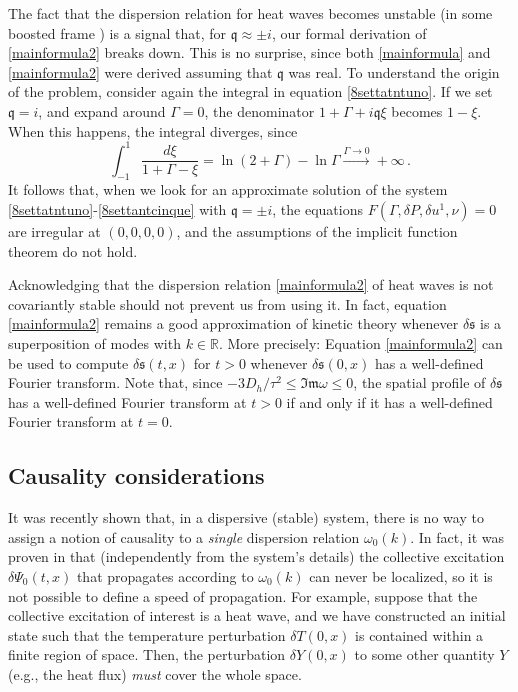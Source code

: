 \documentclass[a4paper, amsfonts, amssymb, amsmath, reprint, showkeys, nofootinbib, twoside,notitlepage,onecolumn]{revtex4-2}
\newcommand{\q}{{\mathfrak{q}}}
\theoremstyle{definition}
\theoremstyle{theorem}
\theoremstyle{corollary}
\begin{document}
The fact that the dispersion relation for heat waves becomes unstable (in some boosted frame \cite{GavassinoBounds2023}) is a signal that, for $\q \approx \pm i$, our formal derivation of \eqref{mainformula2} breaks down. This is no surprise, since both \eqref{mainformula} and \eqref{mainformula2} were derived assuming that $\q$ was real. To understand the origin of the problem, consider again the integral in equation \eqref{8settatntuno}. If we set $\q= i$, and expand around $\Gamma=0$, the denominator $1{+}\Gamma {+} i \q \xi$ becomes $1- \xi$. When this happens, the integral diverges, since
\begin{equation}
\int_{-1}^1 \dfrac{d\xi}{1+\Gamma - \xi} = \ln(2{+}\Gamma)-\ln \Gamma  \xrightarrow[]{\Gamma \longrightarrow 0} +\infty \, .
\end{equation}
It follows that, when we look for an approximate solution of the system \eqref{8settatntuno}-\eqref{8settantcinque} with $\q=\pm i$, the equations $F(\Gamma,\delta P,\delta u^1,\nu){=}0$ are irregular at $(0,0,0,0)$, and the assumptions of the implicit function theorem do not hold. 

Acknowledging that the dispersion relation \eqref{mainformula2} of heat waves is not covariantly stable should not prevent us from using it. In fact, equation \eqref{mainformula2} remains a good approximation of kinetic theory whenever $\delta \mathfrak{s}$ is a superposition of modes with $k \in \mathbb{R}$. More precisely: Equation \eqref{mainformula2} can be used to compute $\delta \mathfrak{s}(t,x)$ for $t>0$ whenever $\delta \mathfrak{s}(0,x)$ has a well-defined Fourier transform. Note that, since $-3D_h/\tau^2 \leq \mathfrak{Im} \omega \leq 0$, the spatial profile of $\delta \mathfrak{s}$ has a well-defined Fourier transform at $t>0$ if and only if it has a well-defined Fourier transform at $t=0$.


\subsection{Causality considerations}

It was recently shown \cite{GavassinoDispersion2024} that, in a dispersive (stable) system, there is no way to assign a notion of causality to a \textit{single} dispersion relation $\omega_0(k)$. In fact, it was proven in \cite{GavassinoDispersion2024} that (independently from the system's details) the collective excitation $\delta\Psi_0(t,x)$ that propagates according to $\omega_0(k)$ can never be localized, so it is not possible to define a speed of propagation. For example, suppose that the collective excitation of interest is a heat wave, and we have constructed an initial state such that the temperature perturbation $\delta T(0,x)$ is contained within a finite region of space. Then, the perturbation $\delta Y(0,x)$ to some other quantity $Y$ (e.g., the heat flux) \textit{must} cover the whole space. 
\end{document}
